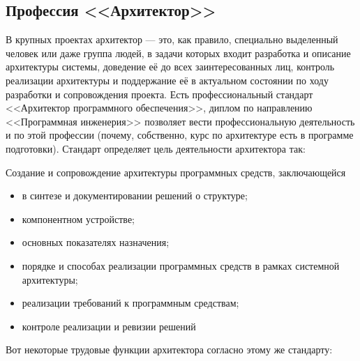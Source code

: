 \documentclass{../../text-style}
\begin{document}
\subsection{Профессия <<Архитектор>>}

В крупных проектах архитектор --- это, как правило, специально выделенный человек или даже группа людей, в задачи которых входит разработка и описание архитектуры системы, доведение её до всех заинтересованных лиц, контроль реализации архитектуры и поддержание её в актуальном состоянии по ходу разработки и сопровождения проекта. Есть профессиональный стандарт <<Архитектор программного обеспечения>>, диплом по направлению <<Программная инженерия>> позволяет вести профессиональную деятельность и по этой профессии (почему, собственно, курс по архитектуре есть в программе подготовки). Стандарт определяет цель деятельности архитектора так:

{\ttfamily
Создание и сопровождение архитектуры программных средств, заключающейся 
    \begin{itemize}
        \item в синтезе и документировании решений о структуре;
        \item компонентном устройстве;
        \item основных показателях назначения; 
        \item порядке и способах реализации программных средств в рамках системной архитектуры; 
        \item реализации требований к программным средствам; 
        \item контроле реализации и ревизии решений
    \end{itemize}
}

Вот некоторые трудовые функции архитектора согласно этому же стандарту:
\end{document}
